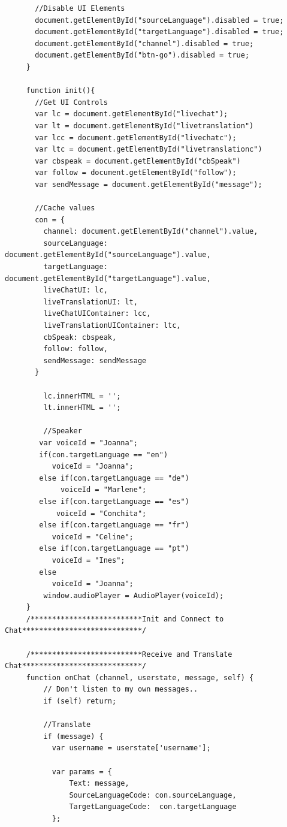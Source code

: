\documentclass[runningheads]{llncs}
\begin{document}
{\begin{verbatim}
       //Disable UI Elements
       document.getElementById("sourceLanguage").disabled = true;
       document.getElementById("targetLanguage").disabled = true;
       document.getElementById("channel").disabled = true;
       document.getElementById("btn-go").disabled = true;
     }

     function init(){
       //Get UI Controls
       var lc = document.getElementById("livechat");
       var lt = document.getElementById("livetranslation")
       var lcc = document.getElementById("livechatc");
       var ltc = document.getElementById("livetranslationc")
       var cbspeak = document.getElementById("cbSpeak")
       var follow = document.getElementById("follow");
       var sendMessage = document.getElementById("message");

       //Cache values
       con = {
         channel: document.getElementById("channel").value,
         sourceLanguage: document.getElementById("sourceLanguage").value,
         targetLanguage: document.getElementById("targetLanguage").value,
         liveChatUI: lc,
         liveTranslationUI: lt,
         liveChatUIContainer: lcc,
         liveTranslationUIContainer: ltc,
         cbSpeak: cbspeak,
         follow: follow,
         sendMessage: sendMessage
       }

         lc.innerHTML = '';
         lt.innerHTML = '';

         //Speaker
        var voiceId = "Joanna";
        if(con.targetLanguage == "en")
           voiceId = "Joanna";
        else if(con.targetLanguage == "de")
             voiceId = "Marlene";
        else if(con.targetLanguage == "es")
            voiceId = "Conchita";
        else if(con.targetLanguage == "fr")
           voiceId = "Celine";
        else if(con.targetLanguage == "pt")
           voiceId = "Ines";
        else
           voiceId = "Joanna";
         window.audioPlayer = AudioPlayer(voiceId);
     }
     /**************************Init and Connect to Chat****************************/

     /**************************Receive and Translate Chat****************************/
     function onChat (channel, userstate, message, self) {
         // Don't listen to my own messages..
         if (self) return;

         //Translate
         if (message) {
           var username = userstate['username'];

           var params = {
               Text: message,
               SourceLanguageCode: con.sourceLanguage,
               TargetLanguageCode:  con.targetLanguage
           };


\end{verbatim}}
\end{document}
